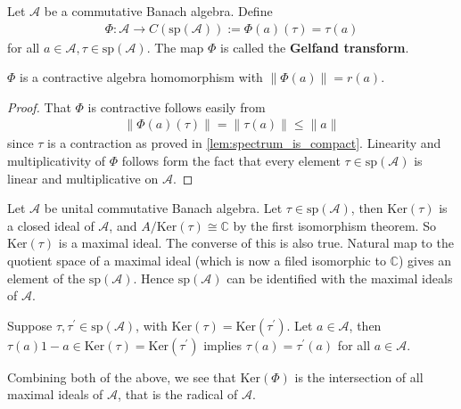 \begin{definition}
  Let $\mathcal{A}$ be a commutative Banach algebra. Define
  \begin{align*}
    \Phi :  \mathcal{A} \to  C(\textrm{sp}(\mathcal{A})) :=
    \Phi(a)(\tau) = \tau(a)
  \end{align*}
  for all $a \in \mathcal{A}, \tau \in \textrm{sp}(\mathcal{A})$. The
  map $\Phi$ is called the \textbf{Gelfand transform}.
\end{definition}

\begin{theorem}
  $\Phi$ is a contractive algebra homomorphism with $\| \Phi(a)\| = r(a)$.
\end{theorem}
\begin{proof}
  That $\Phi$ is contractive follows easily from
  \begin{align*}
    \|\Phi(a)(\tau)\| = \|\tau(a)\| \le \|a\|
  \end{align*}
  since $\tau$ is a contraction as proved in
  \autoref{lem:spectrum_is_compact}. Linearity and multiplicativity
  of $\Phi$ follows form the fact that every element $\tau \in
  \textrm{sp}(\mathcal{A})$ is linear and multiplicative on $\mathcal{A}$.
\end{proof}

\begin{remark}
  Let $\mathcal{A}$ be unital commutative Banach algebra. Let $\tau
  \in \textrm{sp}(\mathcal{A})$, then $\textrm{Ker}(\tau)$ is a
  closed ideal of $\mathcal{A}$, and $A/\textrm{Ker}(\tau) \cong
  \mathbb{C}$ by the first isomorphism theorem. So
  $\textrm{Ker}(\tau)$ is a maximal ideal. The converse of this is
  also true. Natural map to the quotient space of a maximal ideal
  (which is now a filed isomorphic to $\mathbb{C}$) gives an element
  of the $\textrm{sp}(\mathcal{A})$. Hence $\textrm{sp}(\mathcal{A})$
  can be identified with the maximal ideals of $\mathcal{A}$.
\end{remark}

\begin{remark}
  Suppose $\tau, \tau^\prime \in \textrm{sp}(\mathcal{A})$, with
  $\textrm{Ker}(\tau) =\textrm{Ker}(\tau^\prime)$. Let $a \in
  \mathcal{A}$, then $\tau(a)1 - a \in \textrm{Ker}(\tau) =
  \textrm{Ker}(\tau^\prime)$ implies $\tau(a) = \tau^\prime(a)$ for
  all $a \in \mathcal{A}$.
\end{remark}

\begin{remark}
  Combining both of the above, we see that $\textrm{Ker}(\Phi)$ is
  the intersection of all maximal ideals of $\mathcal{A}$, that is
  the radical of $\mathcal{A}$.
\end{remark}

